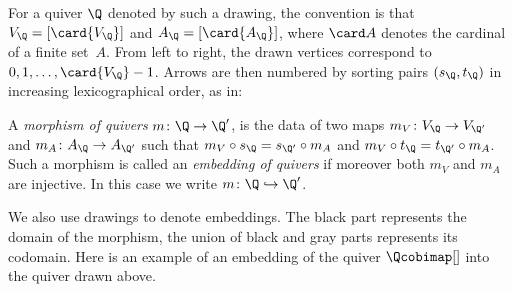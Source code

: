 \documentclass[a4paper,UKenglish,cleveref, autoref, thm-restate]{lipics-v2021}
\begin{document}
For a quiver $\Q$ denoted by such a drawing, the convention is that $V_\Q = [\card{V_\Q}]$ and $A_\Q = [\card{A_\Q}]$, where $\card A$ denotes the cardinal of a finite set~$A$. From left to right, the drawn vertices correspond to $0, 1, \dots, \card{V_\Q}-1$. Arrows are then numbered by sorting pairs $(s_\Q, t_\Q)$ in increasing lexicographical order, as in:
\begin{figure}[h]
\begin{center}
\end{center}
\end{figure}

\begin{definition}
  A \emph{morphism of quivers} $m\colon \Q \to \Q'$, is the data of two maps $m_V\colon V_\Q \to V_{\Q'}$ and $m_A\colon A_\Q \to A_{\Q'}$ such that $m_V \circ s_\Q = s_{\Q'} \circ m_A$ and $m_V \circ t_\Q = t_{\Q'} \circ m_A$. Such a morphism is called an \emph{embedding of quivers} if moreover both $m_V$ and $m_A$ are injective. In this case we write $m\colon \Q \hookrightarrow \Q'$.
\end{definition}

We also use drawings to denote embeddings. The black part represents the domain of the morphism, the union of black and gray parts represents its codomain. Here is an example of an embedding of the quiver $\Qcobimap[]$ into the quiver drawn above.
\begin{center}
\end{center}
\end{document}

